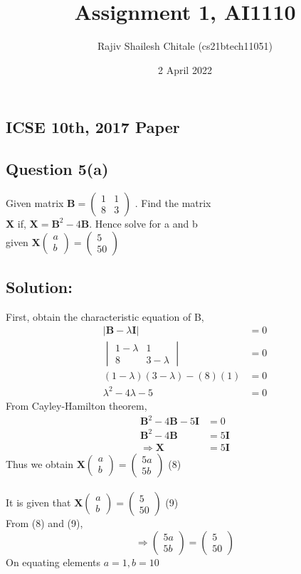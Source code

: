 \documentclass[journal,12pt,twocolumn]{IEEEtran}
\title{Assignment 1, AI1110}
\author{Rajiv Shailesh Chitale (cs21btech11051)}
\date{2 April 2022}
\newcommand{\myvec}[1]{\ensuremath{\begin{pmatrix}#1\end{pmatrix}}}
\let\vec\mathbf
\begin{document}
\maketitle

\subsection*{\textbf{ICSE 10th, 2017 Paper}}
\subsection*{\textbf{Question 5(a)}}
    Given matrix $\vec{B} = \myvec{ 1 & 1 \\8 & 3}$
    . Find the matrix 
    \\
    \textbf{X} if,  $\vec{X} = \vec{B}^2 -4\vec{B}$. Hence solve for a and b
    \\
    given $\vec{X} \myvec{a \\ b}
    = \myvec{5\\50} $
\subsection*{\textbf{Solution:}}
    First, obtain the characteristic equation of B,
    \begin{align}
        |\vec{B}-\lambda \vec{I}| &= 0 
        \\
        \begin{vmatrix} 1-\lambda & 1\\ 8 & 3-\lambda \end{vmatrix} &= 0 
        \\
        (1-\lambda)(3-\lambda)-(8)(1) &= 0
        \\
        \lambda ^2 - 4\lambda -5 &= 0
    \end{align}
        From Cayley-Hamilton theorem,
        \begin{align} 
        \vec{B}^2 -4\vec{B} - 5\vec{I} &= 0
        \\
        \vec{B}^2 -4\vec{B} &= 5\vec{I}
        \\
        \Rightarrow \vec{X} &= 5\vec{I}
    \end{align}
    Thus we obtain $\vec{X} \myvec{a \\ b}
    = \myvec{5a \\ 5b} $
    \hfill (8)
    \\
    \\
    It is given that $\vec{X} \myvec{a \\ b}
    = \myvec{5 \\ 50} $
    \hfill (9)
    \\
    From (8) and (9),
    \[ \Rightarrow \myvec{5a \\ 5b}
    =\myvec{5 \\ 50} \]
    On equating elements $a = 1 , b = 10$
    
\end{document}
